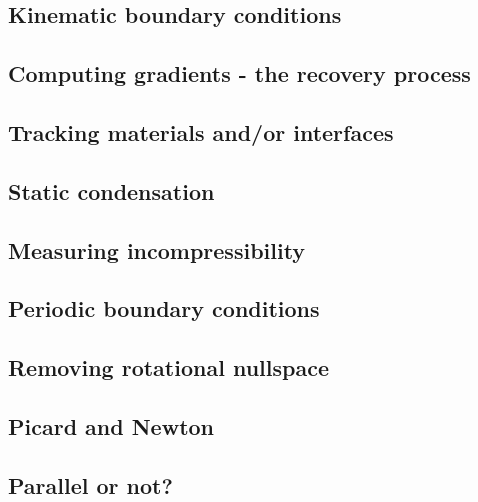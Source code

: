 \documentclass[a4paper]{article}
\begin{document}
\subsection{Kinematic boundary conditions}  %
\newpage %
\subsection{Computing gradients - the recovery process}  %
\newpage %
\subsection{Tracking materials and/or interfaces}  %
\newpage %
\subsection{Static condensation}  %
\newpage %
\subsection{Measuring incompressibility \label{ss_incomp}}  %
\newpage %
\subsection{Periodic boundary conditions\label{ss_periodic}} %
\newpage %
\subsection{Removing rotational nullspace\label{ss_nullspace}} 
\newpage %
\subsection{Picard and Newton \label{ss_nonlinear}}  %
\newpage %
\subsection{Parallel or not?} \label{sec:parallel} 
\newpage %
\end{document}
